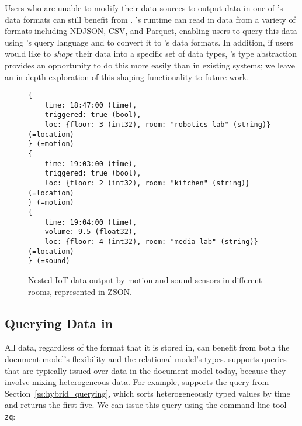 Users who are unable to modify their data sources to output data in one of \sys{}'s data formats can still benefit from \sys{}. \sys{}'s runtime can read in data from a variety of formats including NDJSON, CSV, and Parquet, enabling users to query this data using \sys{}'s query language and to convert it to \sys{}'s data formats. In addition, if users would like to {\em shape} their data into a specific set of data types, \sys{}'s type abstraction provides an opportunity to do this more easily than in existing systems; we leave an in-depth exploration of this shaping functionality to future work.


\begin{figure}
    \begin{verbatim}
{
    time: 18:47:00 (time),
    triggered: true (bool),
    loc: {floor: 3 (int32), room: "robotics lab" (string)} (=location)
} (=motion)
{
    time: 19:03:00 (time),
    triggered: true (bool),
    loc: {floor: 2 (int32), room: "kitchen" (string)} (=location)
} (=motion)
{
    time: 19:04:00 (time),
    volume: 9.5 (float32),
    loc: {floor: 4 (int32), room: "media lab" (string)} (=location)
} (=sound)
    \end{verbatim}
    \vspace{-1.3em}
    \caption{Nested IoT data output by motion and sound sensors in different rooms, represented in ZSON.}
    \label{f:iot_data_nested}
    \vspace{-1.5em}
\end{figure}

\vspace{-0.9em}
\subsection{Querying Data in \sys{}} \label{ss:zed_querying}

All \sys{} data, regardless of the format that it is stored in, can benefit from both the document model's flexibility and the relational model's types. \sys{} supports queries that are typically issued over data in the document model today, because they involve mixing heterogeneous data. For example, \sys{} supports the query from Section~\ref{ss:hybrid_querying}, which sorts heterogeneously typed values by time and returns the first five. We can issue this query using the command-line tool \texttt{zq}:

